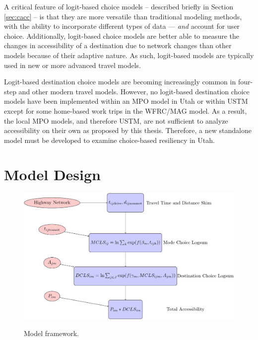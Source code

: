 A critical feature of logit-based choice models – described briefly in Section
\ref{sec:cacc} – is that they are more versatile than traditional modeling
methods, with the ability to incorporate different types of data --- \textit{and}
account for user choice. Additionally, logit-based choice models are better
able to measure the changes in accessibility of a destination due to network
changes than other models because of their adaptive nature. As such, logit-based
models are typically used in new or more advanced travel models.

Logit-based destination choice models are becoming increasingly common in four-
step and other modern travel models. However, no logit-based destination
choice models have been implemented within an MPO model in Utah or within
USTM except for some home-based work trips in the WFRC/MAG model. As a result,
the local MPO models, and therefore USTM, are not sufficient to analyze
accessibility on their own as proposed by this thesis. Therefore, a new
standalone model must be developed to examine choice-based resiliency in Utah.

\section{Model Design} \label{Model Design}

  \begin{figure}
    \centering
  {\includegraphics[width=0.75\linewidth]{figures/chapter3/framework.png}}
  \caption{Model framework.}\label{fig:framework}

  \end{figure}

